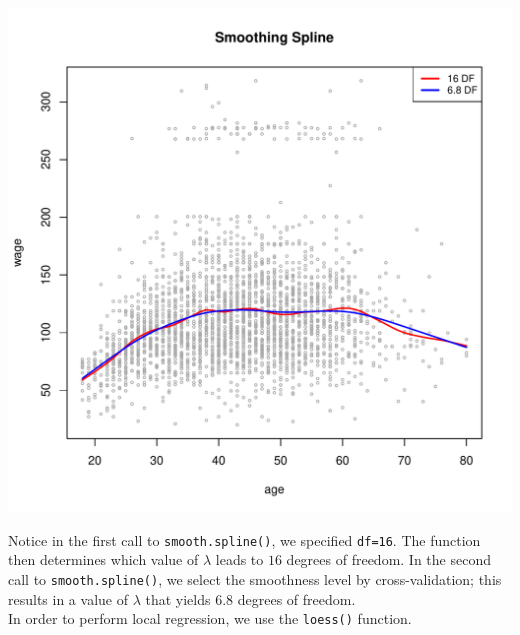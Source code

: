 \documentclass[12pt]{article}\usepackage[]{graphicx}\usepackage[]{color}
\makeatletter
\def\maxwidth{ %
  \ifdim\Gin@nat@width>\linewidth
    \linewidth
  \else
    \Gin@nat@width
  \fi
}
\newenvironment{knitrout}{}{} %
\makeatother
\begin{document}
\begin{knitrout}
\includegraphics[width=\maxwidth]{figure/unnamed-chunk-21-1} 

\end{knitrout}

Notice in the first call to \texttt{smooth.spline()}, we specified \texttt{df=16}. The function then determines which value of $\lambda$ leads to $16$ degrees of freedom. In the second call to \texttt{smooth.spline()}, we select the smoothness level by cross-validation; this results in a value of $\lambda$ that yields $6.8$ degrees of freedom.\\

In order to perform local regression, we use the \texttt{loess()} function.
\end{document}
